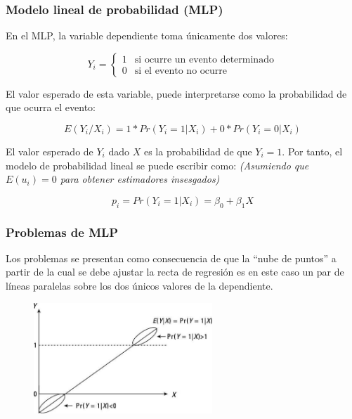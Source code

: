 \documentclass[10pt]{beamer}
\begin{document}
\begin{frame}
\frametitle{Modelo lineal de probabilidad (MLP)}


En el MLP, la variable dependiente toma únicamente dos valores:
	

\begin{equation}
Y_i = \left\lbrace
\begin{matrix} 
1 & \mbox{si ocurre un evento determinado} \\ 
0 & \mbox{si el evento no ocurre}
\end{matrix}
\right.
\end{equation}

El valor esperado de esta variable, puede interpretarse como la probabilidad de que ocurra el evento:  

\begin{equation}
E(Y_i/X_i) = 1 * Pr(Y_i = 1|X_i) + 0 * Pr(Y_i = 0|X_i)
\end{equation}

\vspace{4mm}

El valor esperado de $Y_i$ dado $X$ es la probabilidad de que $Y_i = 1$. Por tanto, el modelo de probabilidad lineal se puede escribir como: \textit{(Asumiendo que $E(u_i) = 0$ para obtener estimadores insesgados)}

\begin{equation}
p_i = Pr(Y_i = 1|X_i) =  \beta_0 +\beta_1 X
\end{equation}

\end{frame}




\begin{frame}
\frametitle{Problemas de MLP}


Los problemas se presentan como consecuencia de que la ``nube de puntos'' a partir de la cual se debe ajustar la recta de regresión es en este caso un par de líneas paralelas sobre los dos únicos valores de la dependiente. 


\begin{figure}
\begin{center}
    \includegraphics[width=0.6\textwidth]{9_2.JPG}
\end{center}
\end{figure}



\end{frame}
\end{document}
